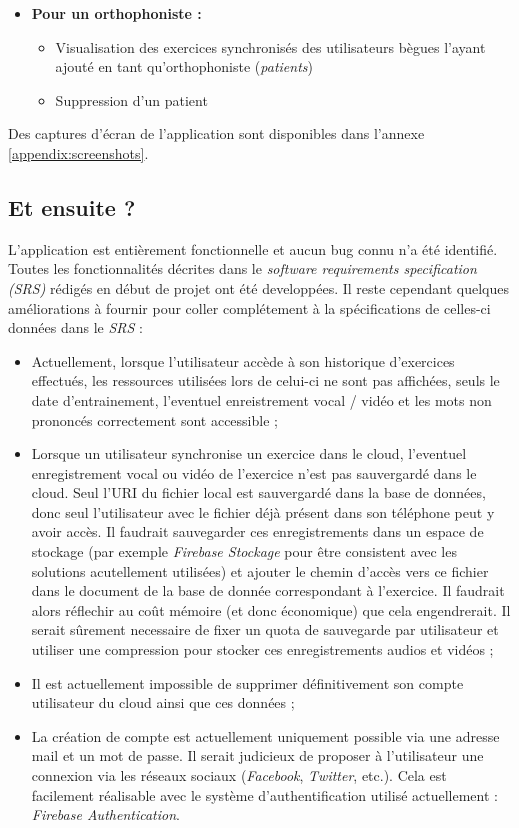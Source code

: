 \begin{itemize}
  \item \textbf{Pour un orthophoniste :}
  \begin{itemize}
    \item Visualisation des exercices synchronisés des utilisateurs bègues l'ayant ajouté en tant qu'orthophoniste (\textit{patients})
    \item Suppression d'un patient
  \end{itemize}
\end{itemize}

Des captures d'écran de l'application sont disponibles dans l'annexe \ref{appendix:screenshots}.

\subsection{Et ensuite ?}
L'application est entièrement fonctionnelle et aucun bug connu n'a été identifié. Toutes les fonctionnalités décrites dans le \textit{software requirements specification (SRS)} rédigés en début de projet ont été developpées. Il reste cependant quelques améliorations à fournir pour coller complétement à la spécifications de celles-ci données dans le \textit{SRS} :

\begin{itemize}
  \item Actuellement, lorsque l'utilisateur accède à son historique d'exercices effectués, les ressources utilisées lors de celui-ci ne sont pas affichées, seuls le date d'entrainement, l'eventuel enreistrement vocal / vidéo et les mots non prononcés correctement sont accessible ;
  \item Lorsque un utilisateur synchronise un exercice dans le cloud, l'eventuel enregistrement vocal ou vidéo de l'exercice n'est pas sauvergardé dans le cloud. Seul l'URI du fichier local est sauvergardé dans la base de données, donc seul l'utilisateur avec le fichier déjà présent dans son téléphone peut y avoir accès. Il faudrait sauvegarder ces enregistrements dans un espace de stockage (par exemple \textit{Firebase Stockage} pour être consistent avec les solutions acutellement utilisées) et ajouter le chemin d'accès vers ce fichier dans le document de la base de donnée correspondant à l'exercice. Il faudrait alors réflechir au coût mémoire (et donc économique) que cela engendrerait. Il serait sûrement necessaire de fixer un quota de sauvegarde par utilisateur et utiliser une compression pour stocker ces enregistrements audios et vidéos ;
  \item Il est actuellement impossible de supprimer définitivement son compte utilisateur du cloud ainsi que ces données ;
  \item La création de compte est actuellement uniquement possible via une adresse mail et un mot de passe. Il serait judicieux de proposer à l'utilisateur une connexion via les réseaux sociaux (\textit{Facebook}, \textit{Twitter}, etc.). Cela est facilement réalisable avec le système d'authentification utilisé actuellement : \textit{Firebase Authentication}.
\end{itemize}

